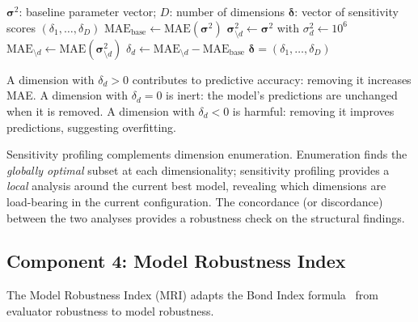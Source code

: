 \documentclass[manuscript,review,anonymous]{acmart}
\newcommand{\MAE}{\mathrm{MAE}}
\begin{document}
\begin{algorithm}[t]
\caption{SensitivityProfile$(\boldsymbol{\sigma}^2, D)$}
\label{alg:sensitivity}
\begin{algorithmic}[1]
\REQUIRE $\boldsymbol{\sigma}^2$: baseline parameter vector; $D$: number of dimensions
\ENSURE $\boldsymbol{\delta}$: vector of sensitivity scores $(\delta_1, \ldots, \delta_D)$
\STATE $\MAE_{\mathrm{base}} \leftarrow \MAE(\boldsymbol{\sigma}^2)$
    \STATE $\boldsymbol{\sigma}_{\setminus d}^2 \leftarrow \boldsymbol{\sigma}^2$ with $\sigma_d^2 \leftarrow 10^6$ 
    \STATE $\MAE_{\setminus d} \leftarrow \MAE(\boldsymbol{\sigma}_{\setminus d}^2)$
    \STATE $\delta_d \leftarrow \MAE_{\setminus d} - \MAE_{\mathrm{base}}$ 
\ENDFOR
\RETURN $\boldsymbol{\delta} = (\delta_1, \ldots, \delta_D)$
\end{algorithmic}
\end{algorithm}

A dimension with $\delta_d > 0$ contributes to predictive accuracy: removing it increases MAE.
A dimension with $\delta_d = 0$ is inert: the model's predictions are unchanged when it is removed.
A dimension with $\delta_d < 0$ is harmful: removing it improves predictions, suggesting overfitting.

Sensitivity profiling complements dimension enumeration.
Enumeration finds the \emph{globally optimal} subset at each dimensionality; sensitivity profiling provides a \emph{local} analysis around the current best model, revealing which dimensions are load-bearing in the current configuration.
The concordance (or discordance) between the two analyses provides a robustness check on the structural findings.

\subsection{Component 4: Model Robustness Index}
\label{sec:mri}

The Model Robustness Index (MRI) adapts the Bond Index formula~\cite{bond2026} from evaluator robustness to model robustness.
\end{document}
